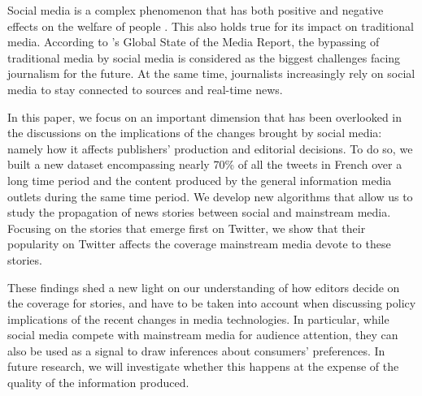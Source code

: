 Social media is a complex phenomenon that has both positive and negative effects on the welfare of people \citep{Allcottetal2020}. This also holds true for its impact on traditional media. According to \citet{Cision2019}'s Global State of the Media Report, the bypassing of traditional media by social media is considered as the biggest challenges facing journalism for the future. At the same time, journalists increasingly rely on social media to stay connected to sources and real-time news.

In this paper, we focus on an important dimension that has been overlooked in the discussions on the implications of the changes brought by social media: namely how it affects publishers' production and editorial decisions. To do so, we built a new dataset encompassing nearly 70\% of all the tweets in French over a long time period and the content produced by the general information media outlets during the same time period. We develop new algorithms that allow us to study the propagation of news stories between social and mainstream media. Focusing on the stories that emerge first on Twitter, we show that their popularity on Twitter affects the coverage mainstream media devote to these stories.

These findings shed a new light on our understanding of how editors decide on the coverage for stories, and have to be taken into account when discussing policy implications of the recent changes in media technologies. In particular, while social media compete with mainstream media for audience attention, they can also be used as a signal to draw inferences about consumers' preferences. In future research, we will investigate whether this happens at the expense of the quality of the information produced.